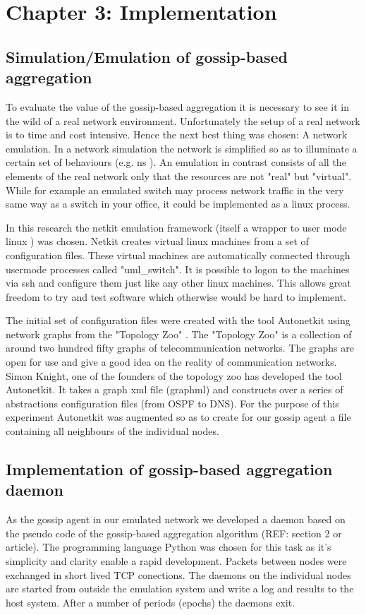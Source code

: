 \documentclass[11pt,a4paper]{article}
\begin{document}
\section{Chapter 3: Implementation}
\subsection{Simulation/Emulation of gossip-based aggregation}
To evaluate the value of the gossip-based aggregation it is necessary to see it in the wild of a real network environment. Unfortunately the setup of a real network is to time and cost intensive. Hence the next best thing was chosen: A network emulation. In a network simulation the network is simplified so as to illuminate a certain set of behaviours (e.g. ns \cite{ns}). An emulation in contrast consists of all the elements of the real network only that the resources are not "real" but "virtual". While for example an emulated switch may process network traffic in the very same way as a switch in your office, it could be implemented as a linux process.

In this research the netkit emulation framework (itself a wrapper to user mode linux \cite{uml}) was chosen. Netkit \cite{netkit} creates virtual linux machines from a set of configuration files. These virtual machines are automatically connected through usermode processes called "uml\_switch". It is possible to logon to the machines via ssh and configure them just like any other linux machines. This allows great freedom to try and test software which otherwise would be hard to implement.

The initial set of configuration files were created with the tool Autonetkit \cite{autonetkit} using network graphs from the "Topology Zoo" \cite{knight_internet_2011}. The "Topology Zoo" is a collection of around two hundred fifty graphs of telecommunication networks. The graphs are open for use and give a good idea on the reality of communication networks. Simon Knight, one of the founders of the topology zoo has developed the tool Autonetkit. It takes a graph xml file (graphml) and constructs over a series of abstractions configuration files (from OSPF to DNS). For the purpose of this experiment Autonetkit was augmented so as to create for our gossip agent a file containing all neighbours of the individual nodes.

\subsection{Implementation of gossip-based aggregation daemon}
As the gossip agent in our emulated network we developed a daemon based on the pseudo code of the gossip-based aggregation algorithm (REF: section 2 or article). The programming language Python \cite{python} was chosen for this task as it's simplicity and clarity enable a rapid development. Packets between nodes were exchanged in short lived TCP conections. The daemons on the individual nodes are started from outside the emulation system and write a log and results to the host system. After a number of periods (epochs) the daemons exit.
\end{document}
